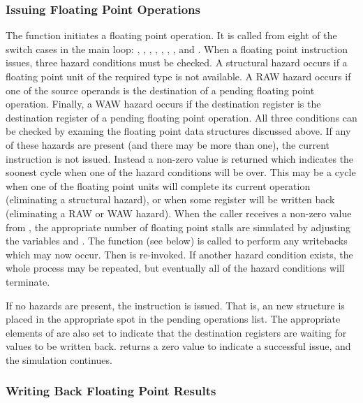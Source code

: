 \subsubsection{Issuing Floating Point Operations}

The function  initiates a floating point operation.  It is called
from eight of the switch cases in the main loop:  , ,
, ,  , , , 
and .  When a floating point instruction issues, three hazard
conditions must be checked.  A structural hazard occurs if a floating point
unit of the required type is not available.  A RAW hazard occurs if one of
the source operands is the destination of a pending floating point operation.
Finally, a WAW hazard occurs if the destination register is the destination
register of a pending floating point operation.  All three conditions can
be checked by examing the floating point data structures discussed above.  If
any of these hazards are present (and there may be more than one), the
current instruction is not issued.  Instead a non-zero value is returned
which indicates the soonest cycle when one of the hazard conditions will
be over.  This may be a cycle when one of the floating point units will 
complete its current operation (eliminating a structural hazard), or
when some register will be written back (eliminating a RAW or WAW hazard).
When the caller receives a non-zero value from , the appropriate
number of floating point stalls are simulated by adjusting the variables
 and .  The function 
(see below) is called to perform any writebacks which may now occur.  Then
 is re-invoked.  If another hazard condition exists, the whole
process may be repeated, but eventually all of the hazard conditions will
terminate.

If no hazards are present, the instruction is issued.  That is, an new 
structure is placed in the appropriate spot in the pending operations list.
The appropriate elements of  are also set to indicate
that the destination registers are waiting for values to be written back.
 returns a zero value to indicate a successful issue, and the
simulation continues.

\subsubsection{Writing Back Floating Point Results}

